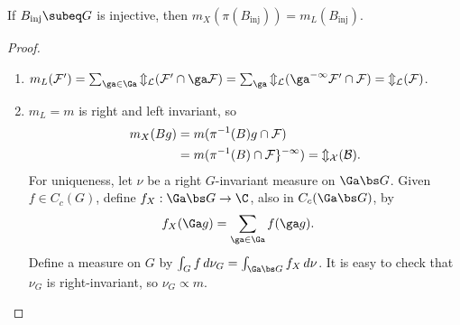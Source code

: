 \begin{cor}
If $B_{\text{inj}}\subeq G$ is injective, then $m_X(\pi(B_{\text{inj}}))=m_L(B_{\text{inj}})$. 
\end{cor}
\begin{proof}
\begin{enumerate}
\item
$m_L(\cal F')= \sum_{\ga \in \Ga} m_L(\cal F' \cap \ga \cal F) = \sum_\ga m_L(\ga^{-1} \cal F'\cap \cal F) = m_L(\cal F)$.
\item
$m_L=m$ is right and left invariant, so
\begin{align}
m_X(Bg) &= m(\pi^{-1}(B) g\cap \cal F)\\
&= m(\pi^{-1}(B)\cap \cal Fg^{-1}) = m_X(B).
\end{align}
For uniqueness, let $\nu$ be a right $G$-invariant measure on $\Ga\bs G$. 
Given $f\in C_c(G)$, define $f_X:\Ga \bs G\to \C$, also in $C_c(\Ga\bs G)$, by
\begin{align}
f_X(\Ga g) &= \sum_{\ga\in \Ga} f(\ga g).
\end{align}
Define a measure on $G$ by $\int_G f \,d\nu_G = \int_{\Ga\bs G} f_X\,d\nu$. It is easy to check that $\nu_G$ is right-invariant, so $\nu_G\propto m$.
\end{enumerate}
\end{proof}
